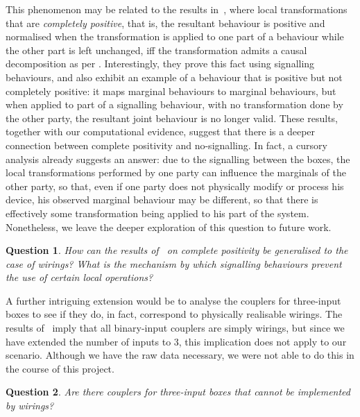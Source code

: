 \documentclass[10pt, a4paper]{article}
\numberwithin{equation}{section} %
\theoremstyle{definition}
\theoremstyle{plain}
\newtheorem{question}{Question}
\newcommand{\?}{\mathrel{?}} %
\begin{document}
                  This phenomenon may be related to the results in~\cite[Sec. 1.5]{LocalTransformations}, where local transformations that are \emph{completely positive}, that is, the resultant behaviour is positive and normalised when the transformation is applied to one part of a behaviour while the other part is left unchanged, iff the transformation admits a causal decomposition as per . Interestingly, they prove this fact using signalling behaviours, and also exhibit an example of a behaviour that is positive but not completely positive: it maps marginal behaviours to marginal behaviours, but when applied to part of a signalling behaviour, with no transformation done by the other party, the resultant joint behaviour is no longer valid. These results, together with our computational evidence, suggest that there is a deeper connection between complete positivity and no-signalling. In fact, a cursory analysis already suggests an answer: due to the signalling between the boxes, the local transformations performed by one party can influence the marginals of the other party, so that, even if one party does not physically modify or process his device, his observed marginal behaviour may be different, so that there is effectively some transformation being applied to his part of the system. Nonetheless, we leave the deeper exploration of this question to future work.
                  \begin{question}
                    How can the results of~\cite{LocalTransformations} on complete positivity be generalised to the case of wirings? What is the mechanism by which signalling behaviours prevent the use of certain local operations?
                  \end{question}

                  A further intriguing extension would be to analyse the couplers for three-input boxes to see if they do, in fact, correspond to physically realisable wirings. The results of~\cite{ShortEntangleSwap} imply that all binary-input couplers are simply wirings, but since we have extended the number of inputs to 3, this implication does not apply to our scenario. Although we have the raw data necessary, we were not able to do this in the course of this project.
                  \begin{question}
                    Are there couplers for three-input boxes that cannot be implemented by wirings?
                  \end{question}
\end{document}
